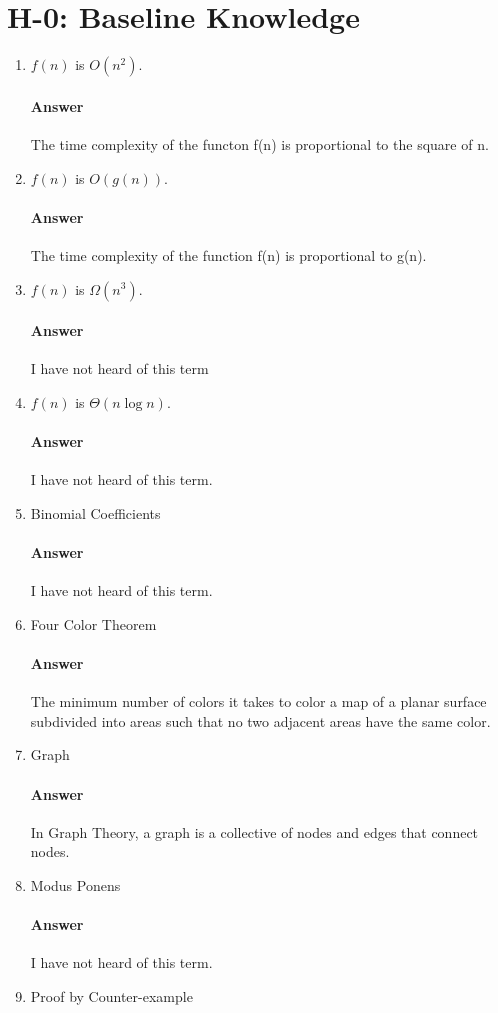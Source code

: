 \documentclass{article}
\begin{document}
\section{H-0: Baseline Knowledge}
\label{appendix:h0}
\begin{enumerate}
    \item $f(n)$ is $O(n^2)$.
	\paragraph{Answer} The time complexity of the functon f(n) is proportional to the square of n.
    \item $f(n)$ is $O(g(n))$.
	\paragraph{Answer} The time complexity of the function f(n) is proportional to g(n).
    \item $f(n)$ is $\Omega(n^3)$.
	\paragraph{Answer} I have not heard of this term
    \item $f(n)$ is $\Theta(n\log n)$.
	\paragraph{Answer} I have not heard of this term.
    \item Binomial Coefficients
	\paragraph{Answer} I have not heard of this term.
    \item Four Color Theorem
	\paragraph{Answer} The minimum number of colors it takes to color a map of a planar surface subdivided into areas such that no two adjacent areas have the same color.
    \item Graph
	\paragraph{Answer} In Graph Theory, a graph is a collective of nodes and edges that connect nodes.
    \item Modus Ponens
	\paragraph{Answer}  I have not heard of this term.
    \item Proof by Counter-example

\end{enumerate}
\end{document}
